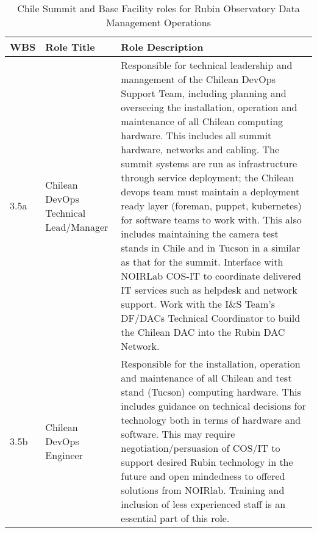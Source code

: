 \normalsize \begin{longtable} {|p{}|p{}|p{}|} \caption{Chile Summit and Base Facility roles for Rubin Observatory Data Management Operations \label{tab:chdfroles}}\\ 
\hline 
\textbf{WBS}&\textbf{Role Title}&\textbf{Role Description} \\ \hline
{3.5a}&{Chilean DevOps Technical Lead/Manager}&{Responsible for technical leadership and management of the Chilean DevOps Support Team, including planning and overseeing the installation, operation and maintenance of all Chilean computing hardware. This includes all summit hardware, networks and cabling. The summit systems are run as infrastructure through service deployment; the Chilean devops team must maintain a deployment ready layer (foreman, puppet, kubernetes) for software teams to work with. This also includes maintaining the camera test stands in Chile and in Tucson in a similar as that for the summit. Interface with NOIRLab COS-IT to coordinate delivered IT services such as helpdesk and network support. Work with the I\&S Team's DF/DACs Technical Coordinator to build the Chilean DAC into the Rubin DAC Network.} \\ \hline
{3.5b}&{Chilean DevOps Engineer}&{Responsible for the installation, operation and maintenance of all Chilean and test stand (Tucson) computing hardware. This includes guidance on technical decisions for technology both in terms of hardware and software. This may require negotiation/persuasion of COS/IT to support desired Rubin technology in the future and open mindedness to offered solutions from NOIRlab. Training and inclusion of less experienced staff is an essential part of this role.} \\ \hline
\end{longtable} \normalsize
